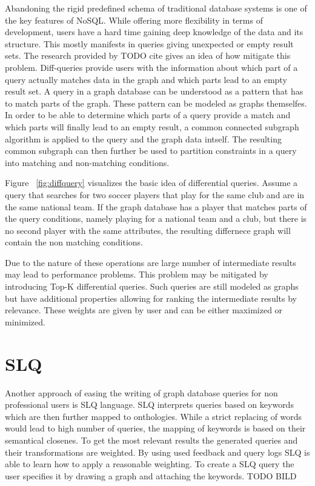 \documentclass{sig-alternate}
\begin{document}
Abandoning the rigid predefined schema of traditional database systems is one of the 
key features of NoSQL. While offering more flexibility in terms of development,
users have a hard time gaining deep knowledge of the data and its structure.
This mostly manifests in queries giving unexpected or empty result sets.
The research provided by TODO cite gives an idea of how mitigate this problem.
Diff-queries provide users with the information about which part of a query actually
matches data in the graph and which parts lead to an empty result set.
A query in a graph database can be understood as a pattern that has to match parts of the graph.
These pattern can be modeled as graphs themselfes. 
In order to be able to determine which parts of a query provide a match
and which parts will finally lead to an empty result, a common connected subgraph algorithm is
applied to the query and the graph data intself.
The resulting common subgraph can then further be used to partition 
constraints in a query into matching and non-matching conditions.

Figure ~\ref{fig:diffquery} visualizes the basic idea of
differential queries. Assume a query that searches for two soccer 
players that play for the same club and are in the same national team.
If the graph database has a player that matches parts of the query conditions,
namely playing for a national team and a club, but there is no second player with the 
same attributes, the resulting differnece graph will contain the non matching conditions.

\begin{figure*}
\centering
{}
\caption{Differential graph for data and query}
\label{fig:diffquery}
\end{figure*}


Due to the nature of these operations are large number of intermediate results 
may lead to performance problems.
This problem may be mitigated by introducing Top-K differential queries. 
Such queries are still modeled as graphs but have additional properties allowing for ranking
the intermediate results by relevance. These weights are given by user and can be either maximized or minimized.

\section{SLQ}
Another approach of easing the writing of graph database queries for non
professional users is SLQ language. SLQ interprets queries based on 
keywords which are then further mapped to onthologies. 
While a strict replacing of words would lead to high number of queries,
the mapping of keywords is based on their semantical closenes.
To get the most relevant results the generated queries and their transformations
are weighted. By using used feedback and query logs SLQ is able to
learn how to apply a reasonable weighting.
To create a SLQ query the user specifies it by drawing a graph
and attaching the keywords.
TODO BILD
\end{document}
